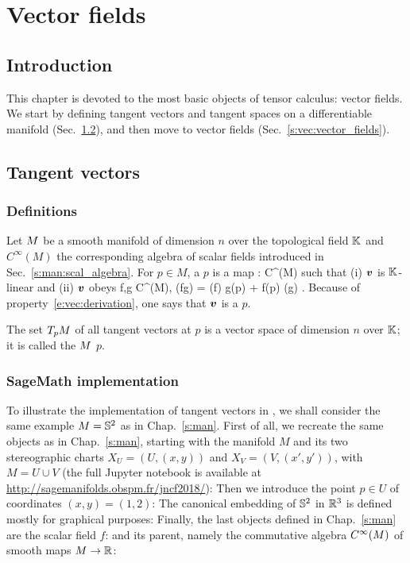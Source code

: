 \chapter{Vector fields} \label{s:vec}

\minitoc

\section{Introduction}

This chapter is devoted to the most basic objects of tensor calculus:
vector fields. We start by defining tangent vectors and tangent spaces
on a differentiable manifold (Sec.~\ref{s:vec:tangent_vectors}), and then
move to vector fields (Sec.~\ref{s:vec:vector_fields}).

\section{Tangent vectors} \label{s:vec:tangent_vectors}

\subsection{Definitions} \label{s:vec:def_tangent_vector}

Let $M$ be a smooth manifold of dimension $n$ over the topological field $\mathbb{K}$
and $C^\infty(M)$ the corresponding algebra of scalar fields introduced in Sec.~\ref{s:man:scal_algebra}.
For $p\in M$, a  $p$ is
a map
\be
    : C^\infty(M) \longrightarrow \K
\ee
such that (i) $\bm{v}$ is $\mathbb{K}$-linear and (ii) $\bm{v}$ obeys
\be \label{e:vec:derivation}
    \forall f,g \in C^\infty(M),\quad
        (fg) = (f) g(p) + f(p) (g) .
\ee
Because of property~\eqref{e:vec:derivation}, one says that $\bm{v}$ is
a  $p$.

The set $T_pM$ of all tangent vectors at $p$ is a vector space of dimension
$n$ over $\mathbb{K}$; it is called the  $M$
 $p$.

\subsection{SageMath implementation} \label{s:vec:tangent_impl}

To illustrate the implementation of tangent vectors in \Sage{}, we shall
consider the same example $M=\mathbb{S}^2$ as in Chap.~\ref{s:man}. First of all,
we recreate the same objects as in Chap.~\ref{s:man}, starting with the manifold
$M$ and its two stereographic charts $X_U = (U,(x,y))$ and $X_V = (V,(x',y'))$,
with $M=U\cup V$ (the full Jupyter notebook is available at
\url{http://sagemanifolds.obspm.fr/jncf2018/}):
Then we introduce the point $p\in U$ of coordinates $(x,y)=(1,2)$:
The canonical embedding of $\mathbb{S}^2$ in $\mathbb{R}^3$ is defined mostly for
graphical purposes:
Finally, the last objects defined in Chap.~\ref{s:man} are the
scalar field $f$:
and its parent, namely the commutative algebra $C^\infty(M)$ of
smooth maps $M\to\mathbb{R}$:

